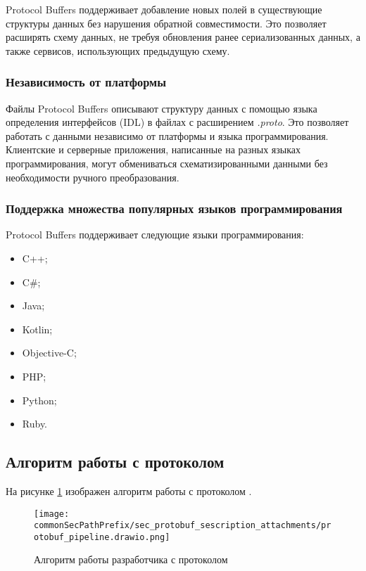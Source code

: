 Protocol Buffers поддерживает добавление новых полей в существующие структуры данных без нарушения обратной совместимости.
Это позволяет расширять схему данных, не требуя обновления ранее сериализованных данных, а также сервисов, использующих предыдущую схему.

\subsubsection{Независимость от платформы}

Файлы Protocol Buffers описывают структуру данных с помощью языка определения интерфейсов (IDL) в файлах с расширением \textit{.proto}.
Это позволяет работать с данными независимо от платформы и языка программирования.
Клиентские и серверные приложения, написанные на разных языках программирования, могут обмениваться схематизированными данными без необходимости ручного преобразования.

\newpage
\subsubsection{Поддержка множества популярных языков программирования}

Protocol Buffers поддерживает следующие языки программирования:
\begin{itemize}
    \item C++;
    \item C\#;
    \item Java;
    \item Kotlin;
    \item Objective-C;
    \item PHP;
    \item Python;
    \item Ruby.
\end{itemize}

\subsection{Алгоритм работы с протоколом}

На рисунке \ref{fig:protobuf_algo} изображен алгоритм работы с протоколом \cite{protobuf_doc}.
\begin{figure}[ht]
    \centering
    \texttt{[image: \\commonSecPathPrefix/sec\_protobuf\_sescription\_attachments/protobuf\_pipeline.drawio.png]}
    \caption{Алгоритм работы разработчика с протоколом}
    \label{fig:protobuf_algo}
\end{figure}


